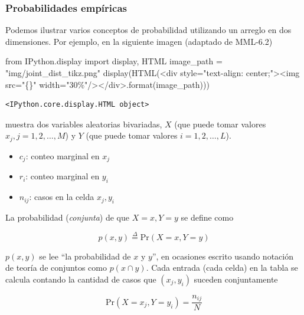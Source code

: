 \documentclass[
  letterpaper,
  DIV=11,
  numbers=noendperiod]{scrartcl}
\newenvironment{Shaded}{\begin{snugshade}}{\end{snugshade}}
\newcommand{\BuiltInTok}[1]{\textcolor[rgb]{0.00,0.23,0.31}{#1}}
\newcommand{\ImportTok}[1]{\textcolor[rgb]{0.00,0.46,0.62}{#1}}
\newcommand{\NormalTok}[1]{\textcolor[rgb]{0.00,0.23,0.31}{#1}}
\newcommand{\OperatorTok}[1]{\textcolor[rgb]{0.37,0.37,0.37}{#1}}
\newcommand{\SpecialCharTok}[1]{\textcolor[rgb]{0.37,0.37,0.37}{#1}}
\newcommand{\StringTok}[1]{\textcolor[rgb]{0.13,0.47,0.30}{#1}}
\providecommand{\tightlist}{%
  \setlength{\itemsep}{0pt}\setlength{\parskip}{0pt}}\usepackage{longtable,booktabs,array}
\begin{document}
\hypertarget{probabilidades-empuxedricas}{%
\subsubsection{Probabilidades
empíricas}\label{probabilidades-empuxedricas}}

Podemos ilustrar varios conceptos de probabilidad utilizando un arreglo
en dos dimensiones. Por ejemplo, en la siguiente imagen (adaptado de
MML-6.2)

\begin{Shaded}
\begin{Highlighting}[]
\ImportTok{from}\NormalTok{ IPython.display }\ImportTok{import}\NormalTok{ display, HTML}
\NormalTok{image\_path }\OperatorTok{=}  \StringTok{"img/joint\_dist\_tikz.png"} 
\NormalTok{display(HTML(}\StringTok{\textquotesingle{}\textless{}div style="text{-}align: center;"\textgreater{}\textless{}img src="}\SpecialCharTok{\{\}}\StringTok{" width="30\%"/\textgreater{}\textless{}/div\textgreater{}\textquotesingle{}}\NormalTok{.}\BuiltInTok{format}\NormalTok{(image\_path)))}
\end{Highlighting}
\end{Shaded}

\begin{verbatim}
<IPython.core.display.HTML object>
\end{verbatim}

muestra dos variables aleatorias bivariadas, \(X\) (que puede tomar
valores \(x_j, j = 1, 2, \dots, M\)) y \(Y\) (que puede tomar valores
\(i=1, 2, \dots, L\)).

\begin{itemize}
\tightlist
\item
  \(c_j\): conteo marginal en \(x_j\)
\item
  \(r_i\): conteo marginal en \(y_i\)
\item
  \(n_{ij}\): casos en la celda \(x_j, y_i\)
\end{itemize}

La probabilidad (\emph{conjunta}) de que \(X=x, Y=y\) se define como

\[
  p(x, y) \overset{\Delta}{=} \text{Pr}(X = x, Y = y)
\]

\(p(x, y)\) se lee ``la probabilidad de \(x\) y \(y\)'', en ocasiones
escrito usando notación de teoría de conjuntos como \(p(x \cap y)\).
Cada entrada (cada celda) en la tabla se calcula contando la cantidad de
casos que \((x_j,y_i)\) suceden conjuntamente

\[
\text{Pr}(X = x_j, Y = y_i) = \frac{n_{ij}}{N} \tag{1}
\]
\end{document}
